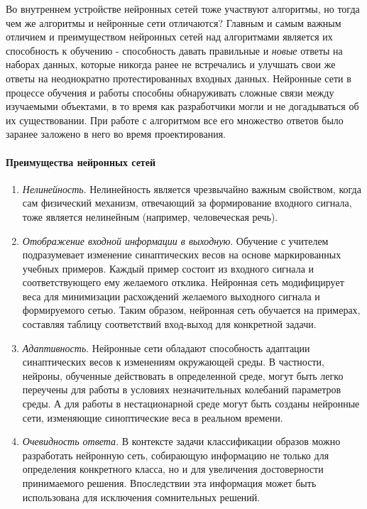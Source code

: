 \documentclass[a4paper,12pt]{report}
\begin{document}
Во внутреннем устройстве нейронных сетей тоже участвуют алгоритмы, но
тогда чем же алгоритмы и нейронные сети отличаются? Главным и самым
важным отличием и преимуществом
нейронных сетей над алгоритмами является их способность к обучению -
способность давать правильные и \textit{новые} ответы на наборах данных,
которые никогда ранее не встречались и улучшать свои же ответы на
неоднократно протестированных входных данных. Нейронные сети в процессе
обучения и работы способны обнаруживать сложные связи между изучаемыми
объектами, в то время как разработчики могли и не догадываться об их
существовании. При работе с алгоритмом все его множество ответов было
заранее заложено в него во время проектирования.

\paragraph{Преимущества нейронных сетей}
\begin{enumerate}
    \item \textit{Нелинейность}. Нелинейность является чрезвычайно важным
        свойством, когда сам физический механизм, отвечающий за
        формирование входного сигнала, тоже является нелинейным
        (например, человеческая речь).
    \item \textit{Отображение входной информации в выходную}. Обучение с
        учителем подразумевает изменение синаптических весов на основе
        маркированных учебных примеров. Каждый пример состоит из
        входного сигнала и соответствующего ему желаемого отклика.
        Нейронная сеть модифицирует веса для минимизации расхождений
        желаемого выходного сигнала и формируемого сетью. Таким
        образом, нейронная сеть обучается на примерах, составляя
        таблицу соответствий вход-выход для конкретной задачи.
    \item \textit{Адаптивность}. Нейронные сети обладают способность адаптации
        синаптических весов к изменениям окружающей среды. В
        частности, нейроны, обученные действовать в определенной
        среде, могут быть легко переучены для работы в условиях
        незначительных колебаний параметров среды. А для работы в
        нестационарной среде могут быть созданы нейронные сети,
        изменяющие синоптические веса в реальном времени.
    \item \textit{Очевидность ответа}. В контексте задачи классификации образов
        можно разработать нейронную сеть, собирающую информацию не
        только для определения конкретного класса, но и для увеличения
        достоверности принимаемого решения. Впоследствии эта
        информация может быть использована для исключения сомнительных
        решений.
\end{enumerate}
\end{document}

